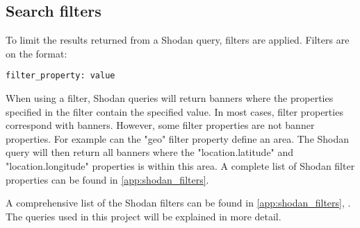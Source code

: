 \subsection{Search filters} \label{sec:filters}
To limit the results returned from a Shodan query, filters are applied. Filters are on the format:
\begin{lstlisting}
filter_property: value
\end{lstlisting}
When using a filter, Shodan queries will return banners where the properties specified in the filter contain the specified value. In most cases, filter properties correspond with banners. However, some filter properties are not banner properties. For example can the "geo" filter property define an area. The Shodan query will then return all banners where the "location.latitude" and "location.longitude" properties is within this area. A complete list of Shodan filter properties can be found in \cref{app:shodan_filters}.

A comprehensive list of the Shodan filters can be found in \cref{app:shodan_filters}, . The queries used in this project will be explained in more detail. 


